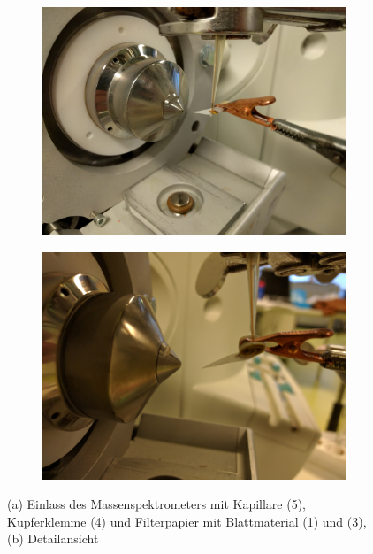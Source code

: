 \begin{figure}[htbp]
  \begin{subfigure}[b]{0.5\textwidth}
    \includegraphics[width=\textwidth]{figures/Kapitel4/VWA_MSLeafspray_Detail1.jpg}
    \caption{}
    \label{fig:MSLeafsprayDetail1}
  \end{subfigure}
  \hfill
  \begin{subfigure}[b]{0.5\textwidth}
    \includegraphics[width=\textwidth]{figures/Kapitel4/VWA_MSLeafspray_Detail2.jpg}
    \caption{}
    \label{fig:MSLeafsprayDetail2}
  \end{subfigure}
  \caption[MS Leafspray Versuchsaufbau Detailfotos, Quelle: Autor]{(a) Einlass des Massenspektrometers mit Kapillare (5), Kupferklemme (4) und Filterpapier mit Blattmaterial (1) und (3), (b) Detailansicht}
  \label{fig:MSLeafsprayDetail}
\end{figure}

